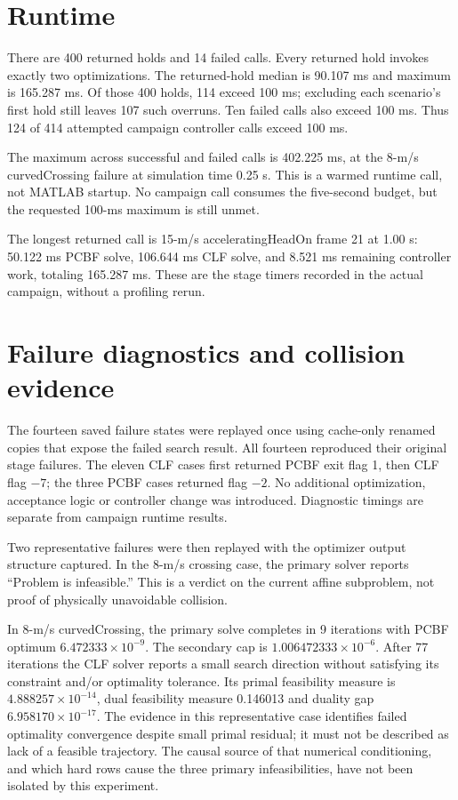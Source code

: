 \documentclass[11pt]{article}
\begin{document}
\section{Runtime}
There are 400 returned holds and 14 failed calls. Every returned hold invokes
exactly two optimizations. The returned-hold median is 90.107 ms and maximum
is 165.287 ms. Of those 400 holds, 114 exceed 100 ms; excluding each scenario's
first hold still leaves 107 such overruns. Ten failed calls also exceed 100 ms.
Thus 124 of 414 attempted campaign controller calls exceed 100 ms.

The maximum across successful and failed calls is 402.225 ms, at the
8-m/s curvedCrossing failure at simulation time 0.25 s. This is a warmed
runtime call, not MATLAB startup. No campaign call consumes the five-second
budget, but the requested 100-ms maximum is still unmet.

The longest returned call is 15-m/s acceleratingHeadOn frame 21 at 1.00 s:
50.122 ms PCBF solve, 106.644 ms CLF solve, and 8.521 ms remaining controller
work, totaling 165.287 ms. These are the stage timers recorded in the actual
campaign, without a profiling rerun.

\section{Failure diagnostics and collision evidence}
The fourteen saved failure states were replayed once using cache-only renamed
copies that expose the failed search result. All fourteen reproduced their
original stage failures. The eleven CLF cases first returned PCBF exit flag 1,
then CLF flag $-7$; the three PCBF cases returned flag $-2$. No additional
optimization, acceptance logic or controller change was introduced. Diagnostic
timings are separate from campaign runtime results.

Two representative failures were then replayed with the optimizer output
structure captured. In the 8-m/s crossing case, the primary solver reports
``Problem is infeasible.'' This is a verdict on the current affine subproblem,
not proof of physically unavoidable collision.

In 8-m/s curvedCrossing, the primary solve completes in 9 iterations with
PCBF optimum $6.472333\times10^{-9}$. The secondary cap is
$1.006472333\times10^{-6}$. After 77 iterations the CLF solver reports a small
search direction without satisfying its constraint and/or optimality tolerance.
Its primal feasibility measure is $4.888257\times10^{-14}$, dual feasibility
measure 0.146013 and duality gap $6.958170\times10^{-17}$. The evidence in this
representative case identifies failed optimality convergence despite small
primal residual; it must not be described as lack of a feasible trajectory.
The causal source of that numerical conditioning, and which hard rows cause
the three primary infeasibilities, have not been isolated by this experiment.
\end{document}
